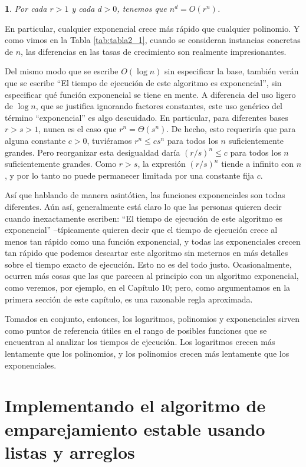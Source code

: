 \documentclass[a4paper, 12pt]{book}
\theoremstyle{dotless}
\newtheorem{theorem}{}%
\begin{document}
\begin{theorem}
Por cada $r>1$ y cada $d>0$, tenemos que $n^d=O(r^n)$.
\end{theorem} 

En particular, cualquier exponencial crece más rápido que cualquier polinomio. Y como vimos en la Tabla \ref{tab:tabla2_1}, cuando se consideran instancias concretas de $n$, las diferencias en las tasas de crecimiento son realmente impresionantes.

Del mismo modo que se escribe $O(\log n)$ sin especificar la base, también verán que se escribe ``El tiempo de ejecución de este algoritmo es exponencial'', sin especificar qué función exponencial se tiene en mente. A diferencia del uso ligero de $\log n$, que se justifica ignorando factores constantes, este uso genérico del término ``exponencial'' es algo descuidado. En particular, para diferentes bases $r> s > 1$, nunca es el caso que $r^n = \Theta(s^n)$. De hecho, esto requeriría que para alguna constante $c>0$, tuviéramos $r^n \leq cs^n$ para todos los $n$ suficientemente grandes. Pero reorganizar esta desigualdad daría $(r/s)^n \leq c$ para todos los $n$ suficientemente grandes. Como $r>s$, la expresión $(r/s)^n$ tiende a infinito con $n$, y por lo tanto no puede permanecer limitada por una constante fija $c$.

Así que hablando de manera asintótica, las funciones exponenciales son todas diferentes. Aún así, generalmente está claro lo que las personas quieren decir cuando inexactamente escriben: ``El tiempo de ejecución de este algoritmo es exponencial'' --típicamente quieren decir que el tiempo de ejecución crece al menos tan rápido como una función exponencial, y todas las exponenciales crecen tan rápido que podemos descartar este algoritmo sin meternos en más detalles sobre el tiempo exacto de ejecución. Esto no es del todo justo. Ocasionalmente, ocurren más cosas que las que parecen al principio con un algoritmo exponencial, como veremos, por ejemplo, en el Capítulo 10; pero, como argumentamos en la primera sección de este capítulo, es una razonable regla aproximada.

Tomados en conjunto, entonces, los logaritmos, polinomios y exponenciales sirven como puntos de referencia útiles en el rango de posibles funciones que se encuentran al analizar los tiempos de ejecución. Los logaritmos crecen más lentamente que los polinomios, y los polinomios crecen más lentamente que los exponenciales.

\section{Implementando el algoritmo de emparejamiento estable usando listas y arreglos}
\end{document}
